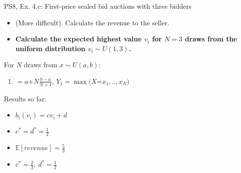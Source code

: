 \begin{frame}{PS8, Ex. 4.c: First-price sealed bid auctions with three bidders}
    \begin{itemize}
      \item[(c)] (More difficult). Calculate the revenue to the seller.
    \end{itemize}
    \vspace{-8pt}
    \begin{multicols}{2}
      \begin{itemize}
        \item[\nth{1} step:] \textbf{Calculate the expected highest value $v_i$ for $N=3$ draws from the uniform distribution $v_i\sim U(1,3)$.}
      \end{itemize}
      \vfill\null\columnbreak
      For $N$ draws from $x\sim U(a, b):$
      \vspace{-6pt}
      \begin{enumerate}
        \item[$\mathbb{E}(Y_1)$] $=a$+$N\frac{b-a}{N+1}$, $Y_1=\max(X$=$x_1,..,x_N)$
      \end{enumerate}
      \vspace{-6pt}
      Results so far:
      \vspace{-6pt}
      \begin{itemize}
        \item[($*$)] $b_i(v_i) = cv_i+d$
        \item[(3.a)] $c^*=d^*=\frac{1}{2}$
        \item[(3.b)] $\mathbb{E}[revenue]=\frac{5}{3}$
        \item[(4.a)] $c^*=\frac{2}{3},\ d^*=\frac{1}{2}$
      \end{itemize}
      \vfill\null
    \end{multicols}
    \vfill\null
\end{frame}
